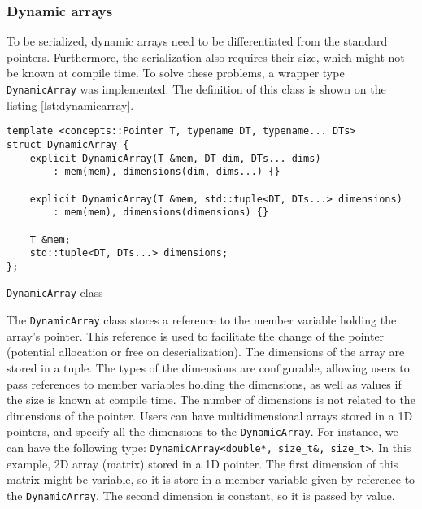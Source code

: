 \subsubsection{Dynamic arrays}

To be serialized, dynamic arrays need to be differentiated from the standard
pointers. Furthermore, the serialization also requires their size, which might
not be known at compile time. To solve these problems, a wrapper type
\texttt{DynamicArray} was implemented. The definition of this class is shown on
the listing \ref{lst:dynamicarray}.

\begin{listing}[ht!]
\begin{verbatim}
template <concepts::Pointer T, typename DT, typename... DTs>
struct DynamicArray {
    explicit DynamicArray(T &mem, DT dim, DTs... dims)
        : mem(mem), dimensions(dim, dims...) {}

    explicit DynamicArray(T &mem, std::tuple<DT, DTs...> dimensions)
        : mem(mem), dimensions(dimensions) {}

    T &mem;
    std::tuple<DT, DTs...> dimensions;
};
\end{verbatim}
\caption{\texttt{DynamicArray} class}
\label{lst:dynamicarray}
\end{listing}

The \texttt{DynamicArray} class stores a reference to the member variable
holding the array's pointer. This reference is used to facilitate the change of
the pointer (potential allocation or free on deserialization). The dimensions of
the array are stored in a tuple. The types of the dimensions are configurable,
allowing users to pass references to member variables holding the dimensions, as
well as values if the size is known at compile time. The number of dimensions is
not related to the dimensions of the pointer. Users can have multidimensional
arrays stored in a 1D pointers, and specify all the dimensions to the
\texttt{DynamicArray}. For instance, we can have the following type:
\texttt{DynamicArray<double*, size\_t\&, size\_t>}. In this example,   2D array
(matrix) stored in a 1D pointer. The first dimension of this matrix might be
variable, so it is store in a member variable given by reference to the
\texttt{DynamicArray}. The second dimension is constant, so it is passed by
value.

